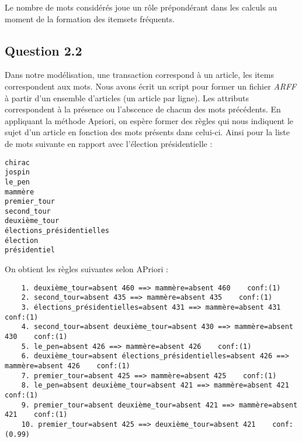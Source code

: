 \documentclass[a4paper,12pt]{article}
\begin{document}
Le nombre de mots considérés joue un rôle prépondérant dans les calculs au moment de la formation des itemsets fréquents.


\subsection*{Question 2.2}

Dans notre modélisation, une transaction correspond à un article, les items correspondent aux mots.
Nous avons écrit un script pour former un fichier \textit{ARFF} à partir d'un ensemble d'articles (un article par ligne).
Les attributs correspondent à la présence ou l'abscence de chacun des mots précédents.
En appliquant la méthode Apriori, on espère former des règles qui nous indiquent le sujet d'un article en fonction des mots présents dans celui-ci.
Ainsi pour la liste de mots suivante en rapport avec l'élection présidentielle :
\begin{lstlisting}
chirac
jospin
le_pen
mammère
premier_tour
second_tour
deuxième_tour
élections_présidentielles
élection
présidentiel
\end{lstlisting}

On obtient les règles suivantes selon APriori :
\begin{lstlisting}
	1. deuxième_tour=absent 460 ==> mammère=absent 460    conf:(1)
	2. second_tour=absent 435 ==> mammère=absent 435    conf:(1)
	3. élections_présidentielles=absent 431 ==> mammère=absent 431    conf:(1)
	4. second_tour=absent deuxième_tour=absent 430 ==> mammère=absent 430    conf:(1)
	5. le_pen=absent 426 ==> mammère=absent 426    conf:(1)
	6. deuxième_tour=absent élections_présidentielles=absent 426 ==> mammère=absent 426    conf:(1)
	7. premier_tour=absent 425 ==> mammère=absent 425    conf:(1)
	8. le_pen=absent deuxième_tour=absent 421 ==> mammère=absent 421    conf:(1)
	9. premier_tour=absent deuxième_tour=absent 421 ==> mammère=absent 421    conf:(1)
	10. premier_tour=absent 425 ==> deuxième_tour=absent 421    conf:(0.99)
\end{lstlisting}
\end{document}

